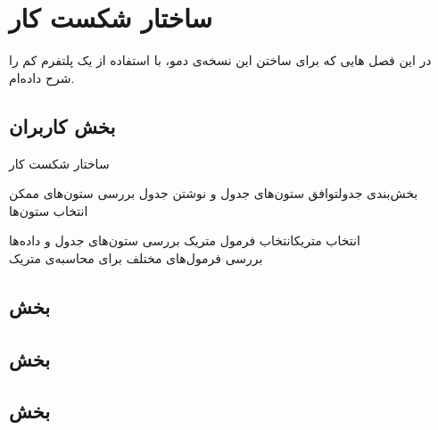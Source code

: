 \chapter{ساختار شکست کار}
در این فصل 
هایی
که برای ساختن این نسخه‌ی دمو، با استفاده از یک پلتفرم کم را شرح داده‌ام.

\section{بخش کاربران}
\begin{wbsbox}{ساختار شکست کار}
\begin{wbssub}{بخش‌بندی جدول}{توافق ستون‌های جدول و نوشتن جدول}
\task بررسی ستون‌های ممکن \\
\task انتخاب ستون‌ها
\end{wbssub}

\begin{wbssub}{انتخاب متریک}{انتخاب فرمول متریک}
\task بررسی ستون‌های جدول و داده‌ها\\
\task بررسی فرمول‌های مختلف ‌برای محاسبه‌ی متریک
\end{wbssub}
\end{wbsbox}

\section{بخش }
\section{بخش }
\section{بخش }
